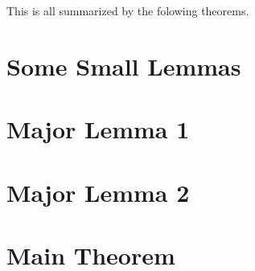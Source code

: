 \documentclass{article}
\begin{document}
This is all summarized by the folowing theorems.
\begin{alltt}
\end{alltt}
\section*{Some Small Lemmas}



\section*{Major Lemma 1}

\section*{Major Lemma 2}

\section*{Main Theorem}


\end{document}
